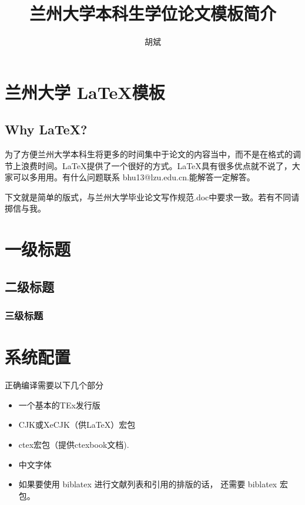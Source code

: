 \documentclass{LZUthesis}
\begin{document}
%
%

\title{{兰州大学本科生学位论文模板简介}}
\author{胡斌}



\maketitle

\makestatement



\frontmatter
\tableofcontents
\mainmatter
\chapter{兰州大学 \LaTeX 模板}

\section{Why \LaTeX ? }
为了方便兰州大学本科生将更多的时间集中于论文的内容当中，而不是在格式的调节上浪费时间。\LaTeX{}提供了一个很好的方式。\LaTeX{}具有很多优点就不说了，大家可以多用用。有什么问题联系 bhu13@lzu.edu.cn.能解答一定解答。
\par 下文就是简单的版式，与兰州大学毕业论文写作规范.doc中要求一致。若有不同请掷信与我。
\chapter{一级标题}
\section{二级标题}
\subsection{三级标题}
\chapter{系统配置}
正确编译需要以下几个部分
\begin{itemize}
\item 一个基本的TEx发行版
\item CJK或XeCJK（供\LaTeX ）宏包
\item ctex宏包（提供ctexbook文档).
\item 中文字体
\item 如果要使用 biblatex 进行文献列表和引用的排版的话， 还需要 biblatex 宏包。
\end{itemize}
\end{document}
